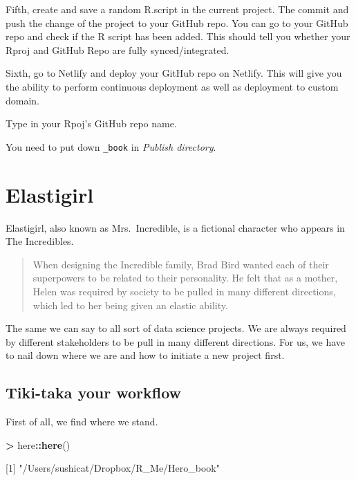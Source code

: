 \documentclass[]{book}
\newenvironment{Shaded}{\begin{snugshade}}{\end{snugshade}}
\newcommand{\DecValTok}[1]{\textcolor[rgb]{0.00,0.00,0.81}{#1}}
\newcommand{\KeywordTok}[1]{\textcolor[rgb]{0.13,0.29,0.53}{\textbf{#1}}}
\newcommand{\NormalTok}[1]{#1}
\newcommand{\OperatorTok}[1]{\textcolor[rgb]{0.81,0.36,0.00}{\textbf{#1}}}
\newcommand{\StringTok}[1]{\textcolor[rgb]{0.31,0.60,0.02}{#1}}
\begin{document}
Fifth, create and save a random R.script in the current project. The commit and push the change of the project to your GitHub repo. You can go to your GitHub repo and check if the R script has been added. This should tell you whether your Rproj and GitHub Repo are fully synced/integrated.

Sixth, go to Netlify and deploy your GitHub repo on Netlify. This will give you the ability to perform continuous deployment as well as deployment to custom domain.

Type in your Rpoj's GitHub repo name.

You need to put down \texttt{\_book} in \emph{Publish directory}.

\hypertarget{elastigirl}{%
\chapter{Elastigirl}\label{elastigirl}}

Elastigirl, also known as Mrs.~Incredible, is a fictional character who appears in The Incredibles.

\begin{quote}
When designing the Incredible family, Brad Bird wanted each of their superpowers to be related to their personality. He felt that as a mother, Helen was required by society to be pulled in many different directions, which led to her being given an elastic ability.
\end{quote}

The same we can say to all sort of data science projects. We are always required by different stakeholders to be pull in many different directions. For us, we have to nail down where we are and how to initiate a new project first.

\hypertarget{tiki-taka-your-workflow}{%
\section{Tiki-taka your workflow}\label{tiki-taka-your-workflow}}

First of all, we find where we stand.

\begin{Shaded}
\begin{Highlighting}[]
\OperatorTok{>}\StringTok{ }\NormalTok{here}\OperatorTok{::}\KeywordTok{here}\NormalTok{()}

\NormalTok{[}\DecValTok{1}\NormalTok{] }\StringTok{"/Users/sushicat/Dropbox/R_Me/Hero_book"}
\end{Highlighting}
\end{Shaded}
\end{document}
